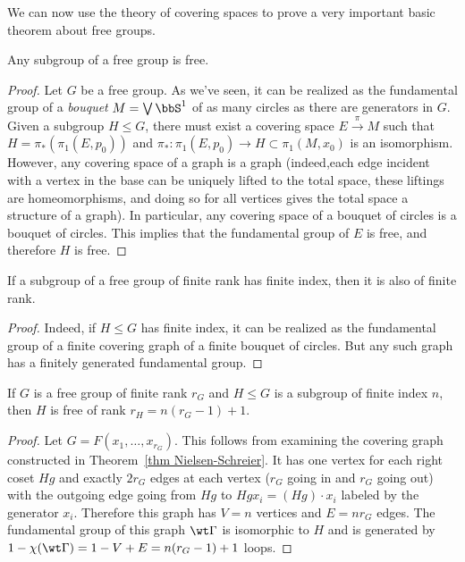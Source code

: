 We can now use the theory of covering spaces to prove a very important basic theorem about free groups. 
\begin{thm}\label{thm Nielsen-Schreier}
    Any subgroup of a free group is free.
\end{thm}
\begin{proof}
    Let $G$ be a free group. As we've seen, it can be realized as the fundamental group of a \emph{bouquet} $M=\bigvee \bbS^1$ of as many circles as there are generators in $G$. Given a subgroup $H\leq G$, there must exist a covering space $E\overset{\pi}{\to}M$ such that $H=\pi_\ast(\pi_1(E,p_0))$ and $\pi_\ast:\pi_1(E,p_0)\to H\subset \pi_1(M,x_0)$ is an isomorphism. However, any covering space of a graph is a graph (indeed,each edge incident with a vertex in the base can be uniquely lifted to the total space, these liftings are homeomorphisms, and doing so for all vertices gives the total space a structure of a graph). In particular, any covering space of a bouquet of circles is a bouquet of circles. This implies that the fundamental group of $E$ is free, and therefore $H$ is free.
\end{proof}
\begin{cor}
    If a subgroup of a free group of finite rank has finite index, then it is also of finite rank.
\end{cor}
\begin{proof}
    Indeed, if $H\leq G$ has finite index, it can be realized as the fundamental group of a finite covering graph of a finite bouquet of circles. But any such graph has a finitely generated fundamental group.
\end{proof}
\begin{thm}
    If $G$ is a free group of finite rank $r_G$ and $H \leq G$ is a subgroup of finite index $n$, then $H$ is free of rank $r_H=n(r_G-1)+1$.
\end{thm}
\begin{proof}
    Let $G=F(x_1,\ldots,x_{r_G})$. This follows from examining the covering graph constructed in Theorem~\ref{thm Nielsen-Schreier}. It has one vertex for each right coset $Hg$ and exactly $2r_G$ edges at each vertex ($r_G$ going in and $r_G$ going out) with the outgoing edge going from $Hg$ to $Hgx_i=(Hg)\cdot x_i$ labeled by the generator $x_i$. Therefore this graph has $V=n$ vertices and $E=nr_G$ edges. The fundamental group of this graph $\wt\Gamma$ is isomorphic to $H$ and is generated by $1-\chi(\wt\Gamma)=1-V+E=n(r_G-1)+1$ loops.
\end{proof}
